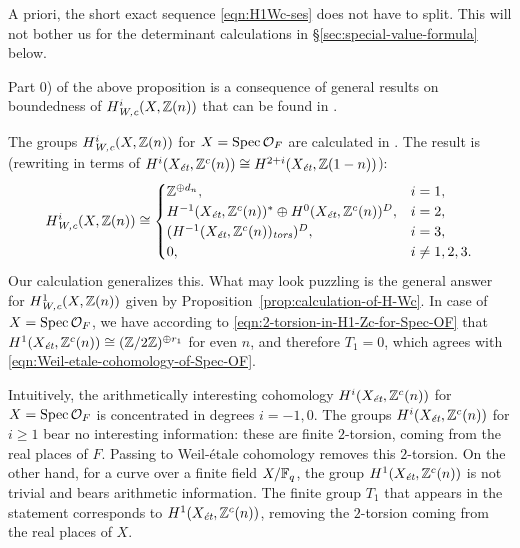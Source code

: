 \documentclass[draft]{article}
\numberwithin{equation}{section}
\begin{document}
\begin{remark}
  A priori, the short exact sequence \eqref{eqn:H1Wc-ses} does not have to
  split. This will not bother us for the determinant calculations in
  \S\ref{sec:special-value-formula} below.
\end{remark}

\begin{remark}
  Part 0) of the above proposition is a consequence of general results on
  boundedness of $H^i_\Wc (X,\ZZ(n))$ that can be found in
  \cite[\S 7]{Beshenov-Weil-etale-1}.
\end{remark}

\begin{remark}
  The groups $H^i_\Wc (X, \ZZ(n))$ for $X = \Spec \mathcal{O}_F$ are calculated
  in \cite[\S 5.8.3]{Flach-Morin-2018}. The result is (rewriting in terms of
  $H^i (X_\et, \ZZ^c(n)) \cong H^{2+i} (X_\et, \ZZ (1-n))$):
  \begin{equation}
    \label{eqn:Weil-etale-cohomology-of-Spec-OF}
    H^i_\Wc (X, \ZZ(n)) \cong
    \begin{cases}
      \ZZ^{\oplus d_n}, & i = 1, \\
      H^{-1} (X_\et, \ZZ^c (n))^* \oplus H^0 (X_\et, \ZZ^c (n))^D, & i = 2, \\
      (H^{-1} (X_\et, \ZZ^c (n))_\tors)^D, & i = 3, \\
      0, & i \ne 1,2,3.
    \end{cases}
  \end{equation}
  Our calculation generalizes this. What may look puzzling is the general answer
  for $H^1_\Wc (X,\ZZ(n))$ given by
  Proposition~\ref{prop:calculation-of-H-Wc}. In case of
  $X = \Spec \mathcal{O}_F$, we have according to
  \eqref{eqn:2-torsion-in-H1-Zc-for-Spec-OF} that
  $H^1 (X_\et, \ZZ^c(n)) \cong (\ZZ/2\ZZ)^{\oplus r_1}$ for even $n$, and
  therefore $T_1 = 0$, which agrees with
  \eqref{eqn:Weil-etale-cohomology-of-Spec-OF}.

  Intuitively, the arithmetically interesting cohomology $H^i (X_\et, \ZZ^c(n))$
  for $X = \Spec \mathcal{O}_F$ is concentrated in degrees $i = -1,0$. The
  groups $H^i (X_\et, \ZZ^c (n))$ for $i \ge 1$ bear no interesting information:
  these are finite $2$-torsion, coming from the real places of $F$. Passing to
  Weil-\'{e}tale cohomology removes this $2$-torsion. On the other hand, for a curve
  over a finite field $X/\FF_q$, the group $H^1 (X_\et, \ZZ^c (n))$ is not
  trivial and bears arithmetic information. The finite group $T_1$ that appears
  in the statement corresponds to $H^1 (X_\et, \ZZ^c (n))$, removing the
  $2$-torsion coming from the real places of $X$.
\end{remark}
\end{document}
